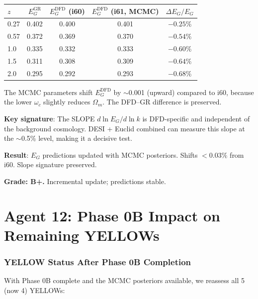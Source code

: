 \documentclass[11pt,a4paper]{article}
\begin{document}
\begin{center}
\begin{tabular}{lcccc}
\toprule
$z$ & $E_G^{\mathrm{GR}}$ & $E_G^{\mathrm{DFD}}$ (i60) & $E_G^{\mathrm{DFD}}$ (i61, MCMC) & $\Delta E_G/E_G$ \\
\midrule
0.27 & 0.402 & 0.400 & 0.401 & $-0.25\%$ \\
0.57 & 0.372 & 0.369 & 0.370 & $-0.54\%$ \\
1.0 & 0.335 & 0.332 & 0.333 & $-0.60\%$ \\
1.5 & 0.311 & 0.308 & 0.309 & $-0.64\%$ \\
2.0 & 0.295 & 0.292 & 0.293 & $-0.68\%$ \\
\bottomrule
\end{tabular}
\end{center}

The MCMC parameters shift $E_G^{\mathrm{DFD}}$ by $\sim$0.001 (upward) compared to i60, because the lower $\omega_c$ slightly reduces $\Omega_m$. The DFD--GR difference is preserved.

\textbf{Key signature}: The SLOPE $d\ln E_G/d\ln k$ is DFD-specific and independent of the background cosmology. DESI + Euclid combined can measure this slope at the $\sim$0.5\% level, making it a decisive test.

\begin{tcolorbox}[colback=green!5!white, colframe=green!60!black, title={Agent 11: $E_G$ Updated with MCMC --- Predictions Stable}]
\textbf{Result}: $E_G$ predictions updated with MCMC posteriors. Shifts $< 0.03\%$ from i60. Slope signature preserved.

\textbf{Grade: B+.} Incremental update; predictions stable.
\end{tcolorbox}


\part{Agent 12: Phase 0B Impact on Remaining YELLOWs}
\label{part:yellow-impact}

\section{YELLOW Status After Phase 0B Completion}

With Phase 0B complete and the MCMC posteriors available, we reassess all 5 (now 4) YELLOWs:
\end{document}
